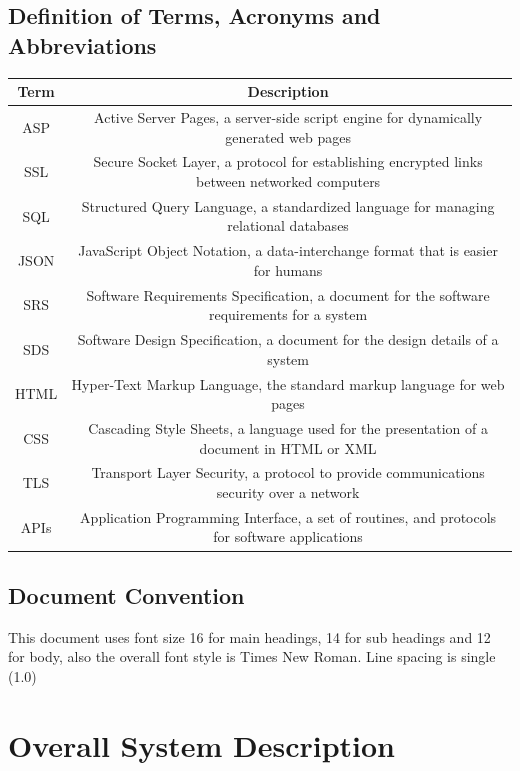 \documentclass[a4paper, 12pt]{article}
\begin{document}
\subsection{Definition of Terms, Acronyms and Abbreviations}
  \begin{tabular}{|c|c|}
    \hline
    \textbf {Term} & \textbf {Description}\\
    \hline
    ASP & Active Server Pages, a server-side script engine for dynamically generated web pages\\
    \hline
    SSL & Secure Socket Layer, a protocol for establishing encrypted links between networked computers\\
    \hline
    SQL & Structured Query Language, a standardized language for managing relational databases\\
    \hline
    JSON & JavaScript Object Notation, a data-interchange format that is easier for humans\\
    \hline
    SRS & Software Requirements Specification, a document for the software requirements for a system\\
    \hline
    SDS & Software Design Specification, a document for the design details of a system\\
    \hline
    HTML & Hyper-Text Markup Language, the standard markup language for web pages\\
    \hline
    CSS & Cascading Style Sheets, a language used for the presentation of a document in HTML or XML\\
    \hline
    TLS & Transport Layer Security, a protocol to provide communications security over a network\\
    \hline
    APIs & Application Programming Interface, a set of routines, and protocols for software applications\\
    \hline
  \end{tabular}

\subsection{Document Convention}
This document uses font size 16 for main headings, 14 for sub headings and 12 for body, also the overall font style is Times New Roman. Line spacing is single (1.0)

\newpage
\section{Overall System Description}
\end{document}
